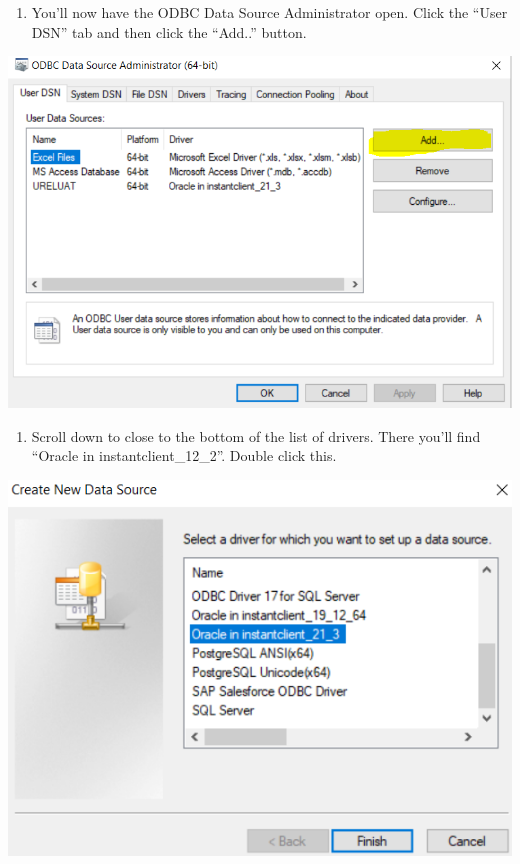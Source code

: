 \documentclass[]{book}
\providecommand{\tightlist}{%
  \setlength{\itemsep}{0pt}\setlength{\parskip}{0pt}}
\begin{document}
\begin{enumerate}
\def\labelenumi{\arabic{enumi})}
\setcounter{enumi}{1}
\tightlist
\item
  You'll now have the ODBC Data Source Administrator open. Click the ``User DSN'' tab and then click the ``Add..'' button.
\end{enumerate}

\includegraphics[width=8.26in]{images/odbc}

\begin{enumerate}
\def\labelenumi{\arabic{enumi})}
\setcounter{enumi}{2}
\tightlist
\item
  Scroll down to close to the bottom of the list of drivers. There you'll find ``Oracle in instantclient\_12\_2''. Double click this.
\end{enumerate}

\includegraphics[width=6.5in]{images/oracle}
\end{document}
